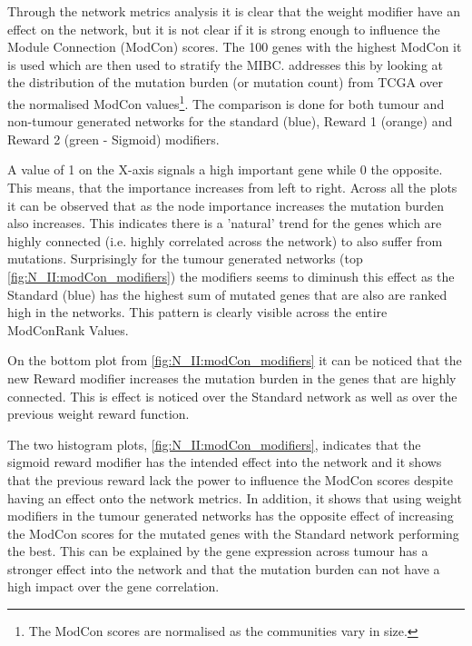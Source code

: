 Through the network metrics analysis it is clear that the weight modifier have an effect on the network, but it is not clear if it is strong enough to influence the Module Connection (ModCon) scores. The 100 genes with the highest ModCon it is used which are then used to stratify the MIBC.  addresses this by looking at the distribution of the mutation burden (or mutation count) from TCGA over the normalised ModCon values\footnote{The ModCon scores are normalised as the communities vary in size.}. The comparison is done for both tumour and non-tumour generated networks for the standard (blue), Reward 1 (orange) and Reward 2 (green - Sigmoid) modifiers. 

A value of 1 on the X-axis signals a high important gene while 0 the opposite. This means, that the importance increases from left to right. Across all the plots it can be observed that as the node importance increases the mutation burden also increases. This indicates there is a 'natural' trend for the genes which are highly connected (i.e. highly correlated across the network) to also suffer from mutations. Surprisingly for the tumour generated networks (top \cref{fig:N_II:modCon_modifiers}) the modifiers seems to diminush this effect as the Standard (blue) has the highest sum of mutated genes that are also are ranked high in the networks. This pattern is clearly visible across the entire ModConRank Values.

On the bottom plot from \cref{fig:N_II:modCon_modifiers} it can be noticed that the new Reward modifier increases the mutation burden in the genes that are highly connected. This is effect is noticed over the Standard network as well as over the previous weight reward function. 

The two histogram plots, \cref{fig:N_II:modCon_modifiers}, indicates that the sigmoid reward modifier has the intended effect into the network and it shows that the previous reward lack the power to influence the ModCon scores despite having an effect onto the network metrics. In addition, it shows that using weight modifiers in the tumour generated networks has the opposite effect of increasing the ModCon scores for the mutated genes with the Standard network performing the best. This can be explained by the gene expression across tumour has a stronger effect into the network and that the mutation burden can not have a high impact over the gene correlation.

